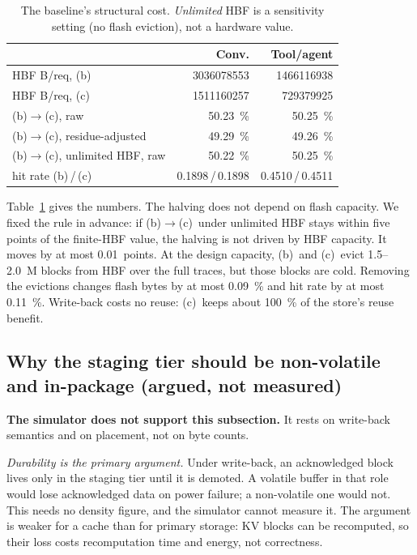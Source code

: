 \documentclass[conference]{IEEEtran}
\newcommand{\cfgb}{\textsf{(b)}}
\newcommand{\cfgc}{\textsf{(c)}}
\begin{document}
\begin{table}[t]
\centering
\caption{The baseline's structural cost. \emph{Unlimited} HBF is a sensitivity
setting (no flash eviction), not a hardware value.}
\label{tab:identity}
\small
\begin{tabular}{lrr}
\toprule
 & \textbf{Conv.} & \textbf{Tool/agent} \\
\midrule
HBF B/req, \cfgb & \num{3036078553} & \num{1466116938} \\
HBF B/req, \cfgc & \num{1511160257} & \num{729379925} \\
\cfgb$\to$\cfgc, raw & \SI{50.23}{\percent} & \SI{50.25}{\percent} \\
\cfgb$\to$\cfgc, residue-adjusted & \SI{49.29}{\percent} & \SI{49.26}{\percent} \\
\cfgb$\to$\cfgc, unlimited HBF, raw & \SI{50.22}{\percent} & \SI{50.25}{\percent} \\
hit rate \cfgb\,/\,\cfgc & 0.1898\,/\,0.1898 & 0.4510\,/\,0.4511 \\
\bottomrule
\end{tabular}
\end{table}

Table~\ref{tab:identity} gives the numbers. The halving does not depend on
flash capacity. We fixed the rule in advance: if \cfgb$\to$\cfgc\ under
unlimited HBF stays within five points of the finite-HBF value, the halving is
not driven by HBF capacity. It moves by at most \num{0.01}~points. At the design
capacity, \cfgb\ and \cfgc\ evict 1.5--2.0~M blocks from HBF over the full
traces, but those blocks are cold. Removing the evictions changes flash bytes by
at most \SI{0.09}{\percent} and hit rate by at most \SI{+0.11}{\percent}.
Write-back costs no reuse: \cfgc\ keeps about \SI{100}{\percent} of the
store's reuse benefit.

\subsection{Why the staging tier should be non-volatile and in-package (argued,
not measured)}\label{sec:argued}
\textbf{The simulator does not support this subsection.} It rests on
write-back semantics and on placement, not on byte counts.

\emph{Durability is the primary argument.} Under write-back, an acknowledged
block lives only in the staging tier until it is demoted. A volatile buffer in
that role would lose acknowledged data on power failure; a non-volatile one
would not. This needs no density figure, and the simulator cannot measure it.
The argument is weaker for a cache than for primary storage: KV blocks can be
recomputed, so their loss costs recomputation time and energy, not correctness.
\end{document}
